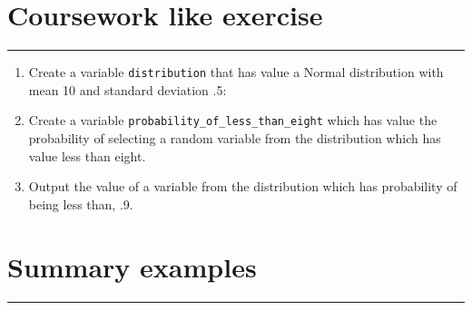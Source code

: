 \documentclass{article}
\begin{document}
\section{Coursework like exercise}
\hrule


\begin{enumerate}
    \item Create a variable \texttt{distribution} that has value a
        Normal distribution with mean 10 and standard deviation .5:
    \item Create a variable \texttt{probability_of_less_than_eight}
        which has value the probability of selecting a random variable from the
        distribution which has value less than eight.
    \item Output the value of a variable from the distribution which has
        probability of being less than, .9.
\end{enumerate}

\section{Summary examples}
\hrule
\end{document}
